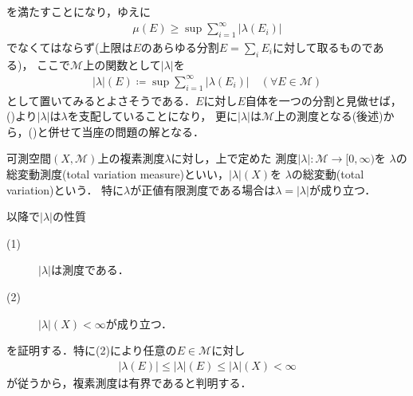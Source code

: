 	を満たすことになり，ゆえに
	\begin{align}
		\mu(E) \geq \sup{}{\sum_{i=1}^{\infty} |\lambda(E_i)|} 
		\label{radon_nikodym_2}
	\end{align}
	でなくてはならず(上限は$E$のあらゆる分割$E = \sum_{i}E_i$に対して取るものである)，
	ここで$\mathcal{M}$上の関数として$|\lambda|$を
	\begin{align}
		|\lambda|(E) \coloneqq \sup{}{\sum_{i=1}^{\infty} |\lambda(E_i)|} \quad (\forall E \in \mathcal{M})
		\label{radon_nikodym_3}
	\end{align}
	として置いてみるとよさそうである．$E$に対し$E$自体を一つの分割と見做せば，()より$|\lambda|$は$\lambda$を支配していることになり，
	更に$|\lambda|$は$\mathcal{M}$上の測度となる(後述)から，()と併せて当座の問題の解となる．
	
	\begin{itembox}[l]{}
		\begin{dfn}
			可測空間$(X,\mathcal{M})$上の複素測度$\lambda$に対し，上で定めた
			測度$|\lambda|:\mathcal{M} \longrightarrow [0,\infty)$を
			$\lambda$の総変動測度(total variation measure)といい，$|\lambda|(X)$を
			$\lambda$の総変動(total variation)という．
			特に$\lambda$が正値有限測度である場合は$\lambda = |\lambda|$が成り立つ．\footnotemark
		\end{dfn}
	\end{itembox}
	
	以降で$|\lambda|$の性質
	\begin{description}
		\item[(1)] $|\lambda|$は測度である．
		\item[(2)] $|\lambda|(X) < \infty$が成り立つ．
	\end{description}
	を証明する．特に(2)により任意の$E \in \mathcal{M}$に対し
	\begin{align}
		|\lambda(E)| \leq |\lambda|(E) \leq |\lambda|(X) < \infty
	\end{align}
	が従うから，複素測度は有界であると判明する．

